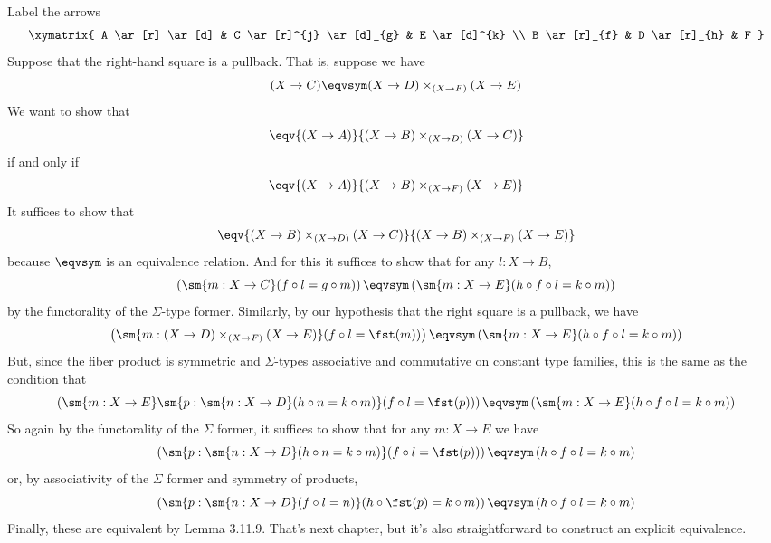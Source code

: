  \soln
Label the arrows
\[\xymatrix{
  A \ar[r] \ar[d] & C \ar[r]^{j} \ar[d]_{g} & E \ar[d]^{k} \\
  B \ar[r]_{f} & D \ar[r]_{h} & F
}\]
Suppose that the right-hand square is a pullback.  That is, suppose we have
\[
  (X \to C) \eqvsym (X \to D) \times_{(X \to F)} (X \to E)
\]
We want to show that
\[
  \eqv{(X \to A)}{(X \to B) \times_{(X \to D)} (X \to C)}
\]
if and only if
\[
  \eqv{(X \to A)}{(X \to B) \times_{(X \to F)} (X \to E)}
\]
It suffices to show that 
\[
  \eqv{(X \to B) \times_{(X \to D)} (X \to C)}{(X \to B) \times_{(X \to F)} (X \to E)}
\]
because $\eqvsym$ is an equivalence relation.  And for this it suffices to show
that for any $l : X \to B$,
\[
  \left(
    \sm{m : X \to C}(f \circ l = g \circ m)
  \right)
  \eqvsym
  \left(
    \sm{m : X \to E}(h \circ f \circ l = k \circ m)
  \right)
\]
by the functorality of the $\Sigma$-type former.  Similarly, by our hypothesis
that the right square is a pullback, we have
\[
  \left(
    \sm{m : (X \to D) \times_{(X \to F)} (X \to E)}(f \circ l = \fst(m))
  \right)
  \eqvsym
  \left(
    \sm{m : X \to E}(h \circ f \circ l = k \circ m)
  \right)
\]
But, since the fiber product is symmetric and $\Sigma$-types associative and
commutative on constant type families, this is the same as the condition that
\[
  \left(
    \sm{m : X \to E} \sm{p : \sm{n : X \to D}(h \circ n = k \circ m)}
        (f \circ l = \fst(p))
  \right)
  \eqvsym
  \left(
    \sm{m : X \to E}(h \circ f \circ l = k \circ m)
  \right)
\]
So again by the functorality of the $\Sigma$ former, it suffices to show that
for any $m : X \to E$ we have
\[
  \left(
    \sm{p : \sm{n : X \to D}(h \circ n = k \circ m)}
        (f \circ l = \fst(p))
  \right)
  \eqvsym
  \left(
    h \circ f \circ l = k \circ m
  \right)
\]
or, by associativity of the $\Sigma$ former and symmetry of products,
\[
  \left(
    \sm{p : \sm{n : X \to D} (f \circ l = n)}
    (h \circ \fst(p) = k \circ m)
  \right)
  \eqvsym
  \left(
    h \circ f \circ l = k \circ m
  \right)
\]
Finally, these are equivalent by Lemma 3.11.9.  That's next chapter, but it's
also straightforward to construct an explicit equivalence.
